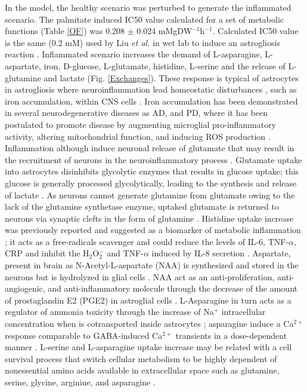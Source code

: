 In the model, the healthy scenario was perturbed to generate the inflammated scenario. The palmitate induced IC50 value calculated for a set of metabolic functions (Table \ref{OF}) was 0.208 $\pm$ 0.024 mMgDW$^{-1}$h$^{-1}$. Calculated IC50 value is the same (0.2 mM) used by Liu \emph{et al.} in wet lab to induce an astrogliosis reaction \cite{Liu2013}. Inflammated scenario increases the demand of L-asparagine, L-aspartate, iron, D-glucose, L-glutamate, histidine, L-serine and the release of L-glutamine and lactate (Fig. \ref{Exchanges}). These response is typical of astrocytes in astrogliosis where neuroinflammation lead homeostatic disturbances \cite{Rangel-Aldao2015}, such as iron accumulation, within CNS cells \cite{Jha2016}. Iron accumulation has been demonstrated in several neurodegenerative diseases as AD, and PD, where it has been postulated to promote disease by augmenting microglial pro-inflammatory activity, altering mitochondrial function, and inducing ROS production \cite{Williams2012}.
Inflammation although induce neuronal release of glutamate that may result in the recruitment of neurons in the neuroinflammatory process \cite{Parpura2000}. Glutamate uptake into astrocytes disinhibits glycolytic enzymes that results in glucose uptake;  this glucose is generally processed glycolytically, leading to the synthesis and release of lactate \cite{Jha2016}. As neurons cannot generate glutamine from glutamate owing to the lack of the glutamine synthetase enzyme, uptaked glutamate is returned to neurons via synaptic clefts in the form of glutamine \cite{Hertz1999}.
Histidine uptake increase was previously reported and suggested as a biomarker of metabolic inflammation \cite{Niu2012}; it acts as a free-radicals scavenger and could reduce the levels of IL-6, TNF-$\alpha$, CRP and inhibit the H$_2$O$_2^-$ and TNF-$\alpha$ induced by IL-8 secretion \cite{Lee2005,Son2005}. Aspartate, present in brain as N-Acetyl-L-aspartate (NAA) is synthesized and stored in the neurons but is hydrolyzed in glial cells \cite{Baslow2003}. NAA act as an anti-proliferation, anti-angiogenic, and anti-inflammatory molecule through the decrease of the amount of prostaglandin E2 (PGE2) in astroglial cells \cite{Rael2004}. L-Asparagine in turn acts as a regulator of ammonia toxicity through the increase of Na$^+$ intracellular concentration when is cotransported inside astrocytes \cite{Chaudhry1999}; asparagine induce a Ca$^{2+}$ response comparable to GABA-induced Ca$^{2+}$ transients in a dose-dependent manner \cite{Doengi2009}. L-serine and L-asparagine uptake increase may be related with a cell survival process that switch cellular metabolism to be highly dependent of nonessential amino acids available in extracellular space such as glutamine, serine, glycine, arginine, and asparagine \cite{Green2014}.
